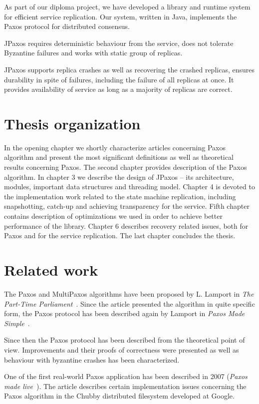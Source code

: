 As part of our diploma project, we have developed a library and runtime system for efficient service replication. Our system, written in Java, implements the Paxos protocol \cite{Lam98} for distributed consensus.

JPaxos requires deterministic behaviour from the service, does not tolerate Byzantine failures and works with static group of replicas.

JPaxos supports replica crashes as well as recovering the crashed replicas, ensures durability in spite of failures, including the failure of all replicas at once. It provides availability of service as long as a majority of replicas are correct.


\section{Thesis organization}

In the opening chapter we shortly characterize articles concerning Paxos algorithm and present the most significant definitions as well as theoretical results concerning Paxos.
The second chapter provides description of the Paxos algorithm.
In chapter 3 we describe the design of JPaxos -- its architecture, modules, important data structures and threading model.
Chapter 4 is devoted to the implementation work related to the state machine replication, including snapshotting, catch-up and achieving transparency for the service.
Fifth chapter contains description of optimizations we used in order to achieve better performance of the library.
Chapter 6 describes recovery related issues, both for Paxos and for the service replication.
The last chapter concludes the thesis.

\section{Related work}

The Paxos and MultiPaxos algorithms have been proposed by L. Lamport in \textit{The Part-Time Parliament}~\cite{Lam98}. Since the article presented the algorithm in quite specific form, the Paxos protocol has been described again by Lamport in \textit{Paxos Made Simple}~\cite{Lam01}.

Since then the Paxos protocol has been described from the theoretical point of view. Improvements and their proofs of correctness were presented as well as behaviour with byzantine crashes has been characterized.

One of the first real-world Paxos application has been described in 2007 (\textit{Paxos made live}~\cite{CGR07}). The article describes certain implementation issues concerning the Paxos algorithm in the Chubby distributed filesystem developed at Google.

